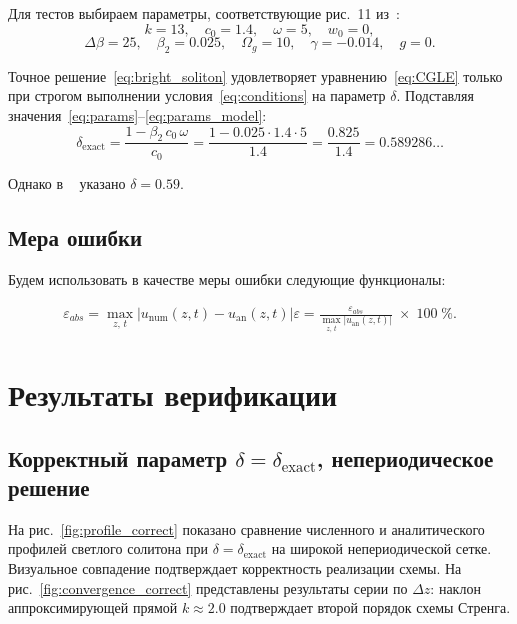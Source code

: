 \documentclass{article}
\begin{document}
Для тестов выбираем параметры, соответствующие рис.~11 из~\cite{main}:
\begin{equation}\label{eq:params}
    k = 13,\quad c_0 = 1.4,\quad \omega = 5,\quad w_0 = 0,
\end{equation}
\begin{equation}\label{eq:params_model}
    \Delta\beta = 25,\quad \beta_2 = 0.025,\quad \Omega_g = 10,\quad
    \gamma = -0.014,\quad g = 0.
\end{equation}

Точное решение~\eqref{eq:bright_soliton} удовлетворяет уравнению~\eqref{eq:CGLE} только при строгом выполнении условия~\eqref{eq:conditions} на параметр $\delta$. Подставляя значения~\eqref{eq:params}--\eqref{eq:params_model}:
\[
    \delta_{\mathrm{exact}}
    = \frac{1 - \beta_2\,c_0\,\omega}{c_0}
    = \frac{1 - 0.025 \cdot 1.4 \cdot 5}{1.4}
    = \frac{0.825}{1.4}
    = 0.589286\ldots
\]

Однако в ~\cite{main} указано $\delta = 0.59$.

\subsection{Мера ошибки}

Будем использовать в качестве меры ошибки следующие функционалы:

\begin{equation}
    \begin{aligned}
        \varepsilon_{abs} = \displaystyle\max_{z,\,t}\bigl|u_{\mathrm{num}}(z,t) - u_{\mathrm{an}}(z,t)\bigr|
        \varepsilon = \frac{\varepsilon_{abs}}{\displaystyle\max_{z,\,t}\bigl|u_{\mathrm{an}}(z,t)\bigr|}\;\times\; 100\;\%.
    \end{aligned}
\end{equation}

\section{Результаты верификации}

\subsection{Корректный параметр \(\delta = \delta_{\mathrm{exact}}\), непериодическое решение}

На рис.~\ref{fig:profile_correct} показано сравнение численного и аналитического профилей светлого солитона при $\delta = \delta_{\mathrm{exact}}$ на широкой непериодической сетке. Визуальное совпадение подтверждает корректность реализации схемы. На рис.~\ref{fig:convergence_correct} представлены результаты серии по $\Delta z$: наклон аппроксимирующей прямой $k \approx 2.0$ подтверждает второй порядок схемы Стренга.
\end{document}

